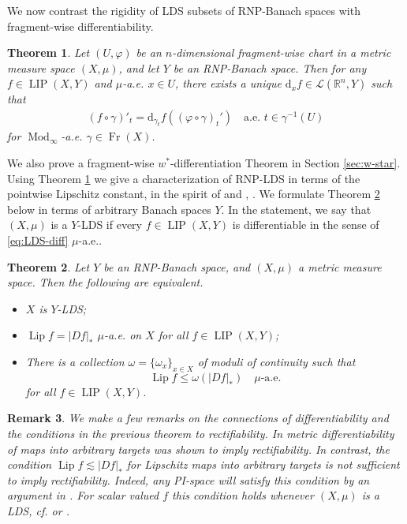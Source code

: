 \documentclass{amsart}
\newtheorem{theorem}{Theorem}[section]
\newtheorem{remark}[theorem]{Remark}
\numberwithin{equation}{section}
\newcommand{\R}{\mathbb{R}}
\newcommand{\leb}{\mathcal{L}}
\newcommand{\Mod}{\operatorname{Mod}}
\newcommand{\Lip}{\operatorname{Lip}}
\newcommand{\LIP}{\operatorname{LIP}}
\newcommand{\Fr}{\operatorname{Fr}}
\newcommand{\ud}{\mathrm {d}}
\begin{document}
We now contrast the rigidity of LDS subsets of RNP-Banach spaces with fragment-wise differentiability.
\begin{theorem}\label{thm:fragmentwise}
Let $(U,\varphi)$ be an $n$-dimensional fragment-wise chart in a metric measure space $(X,\mu)$, and let $Y$ be an RNP-Banach space. Then for any $f\in\LIP(X,Y)$ and $\mu$-a.e. $x\in U$, there exists a unique $\ud_xf\in \leb(\R^n,Y)$ such that 
\begin{align*}
(f\circ\gamma)'_t= \ud_{\gamma_t}f((\varphi\circ\gamma)_t')\quad\textrm{a.e. }t\in \gamma^{-1} (U)
\end{align*}
for $\Mod_\infty$-a.e. $\gamma\in\Fr(X)$. 
\end{theorem}

We also prove a fragment-wise $w^*$-differentiation Theorem in Section \ref{sec:w-star}. Using Theorem \ref{thm:fragmentwise} we give a characterization of RNP-LDS in terms of the pointwise Lipschitz constant, in the spirit of \cite[Theorem 1.5.]{tsd24} and \cite[Theorem 1.19]{sch16b}, \cite[Theorem 1.4.]{bkt19}. We formulate Theorem \ref{thm:RNP-LDS-char} below in terms of arbitrary Banach spaces $Y$. In the statement, we say that $(X,\mu)$ is a $Y$-LDS if every $f\in \LIP(X,Y)$ is differentiable in the sense of \eqref{eq:LDS-diff} $\mu$-a.e..

\begin{theorem}\label{thm:RNP-LDS-char}
Let $Y$ be an RNP-Banach space, and $(X,\mu)$ a metric measure space. Then the following are equivalent.
\begin{itemize}
\item[(i)] $X$ is $Y$-LDS;
\item[(ii)] $\Lip f=|Df|_\ast$ $\mu$-a.e. on $X$ for all $f\in \LIP(X,Y)$;
\item[(iii)] There is a collection $\omega =\{ \omega_x \}_{x\in X}$ of moduli of continuity such that 
$$\Lip f\le \omega(|Df|_\ast)\quad \mu \mbox{-a.e.}$$ 
for all $f\in \LIP(X,Y)$.
\end{itemize}
\end{theorem}

\begin{remark} We make a few remarks on the connections of differentiability and the conditions in the previous theorem to rectifiability.
In \cite[Theorem 1.2]{terirect} metric differentiability of maps into arbitrary targets was shown to imply rectifiability. In contrast, the condition $\Lip f\lesssim |Df|_\ast$ for Lipschitz maps into arbitrary targets is not sufficient to imply rectifiability. Indeed, any PI-space will satisfy this condition by an argument in \cite{cheegerkleiner}. For scalar valued $f$ this condition holds whenever $(X,\mu)$ is a LDS, cf. \cite[Theorem 1.15.]{sch16b} or \cite[Theorem 1.5.]{tsd24}. 
\end{remark}
\end{document}
